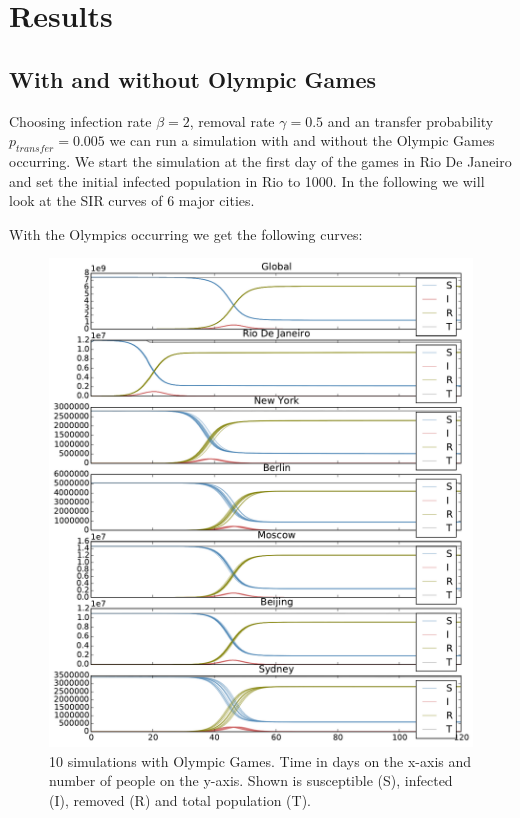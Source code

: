 \section{Results}
\subsection{With and without Olympic Games}
Choosing infection rate $\beta=2$, removal rate $\gamma=0.5$ and an transfer probability $p_{transfer} = 0.005$ we can run a simulation with and without the Olympic Games occurring. We start the simulation at the first day of the games in Rio De Janeiro and set the initial infected population in Rio to 1000. In the following we will look at the SIR curves of 6 major cities.

With the Olympics occurring we get the following curves:
\begin{figure}[H]
	\centering
	\includegraphics[width=1.0 \linewidth]{plots/rio-0-18-380000.pdf}
	\caption{10 simulations with Olympic Games. Time in days on the x-axis and number of people on the y-axis. Shown is susceptible (S), infected (I), removed (R) and total population (T).}
	\label{fig:rio-0-18-380000}
\end{figure}


